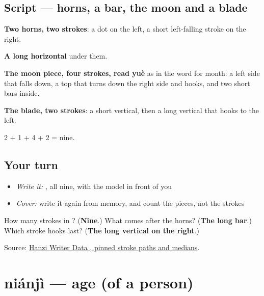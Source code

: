 \subsection*{Script — horns, a bar, the moon and a blade}

\begin{quote}
\end{quote}

\textbf{Two horns, two strokes}: a dot on the left, a short left-falling stroke on the right.

\textbf{A long horizontal} under them.

\textbf{The moon piece, four strokes, read yuè} as in the word for month: a left side that falls down, a top that turns down the right side and hooks, and two short bars inside.

\textbf{The blade, two strokes}: a short vertical, then a long vertical that hooks to the left.

2 + 1 + 4 + 2 = nine.

\subsection*{Your turn}
\begin{itemize}
\raggedright
  \item \emph{Write it:} , all nine, with the model in front of you
  \item \emph{Cover:} write it again from memory, and count the pieces, not the strokes
\end{itemize}

\begin{tcolorbox}[breakable,colback=teal!4,colframe=teal!35!black,title={Before you move on}]
How many strokes in ? (\textbf{Nine}.) What comes after the horns? (\textbf{The long bar}.) Which stroke hooks last? (\textbf{The long vertical on the right}.)

Source: \href{https://raw.githubusercontent.com/chanind/hanzi-writer-data/68d10a4b21150cae5e1ebbd223eed289cf32d90c/data/\%E5\%89\%8D.json}{Hanzi Writer Data , pinned stroke paths and medians}.
\end{tcolorbox}
\section[niánjì]{niánjì — age (of a person)}

\label{lesson:ZH-C78-nianji}



